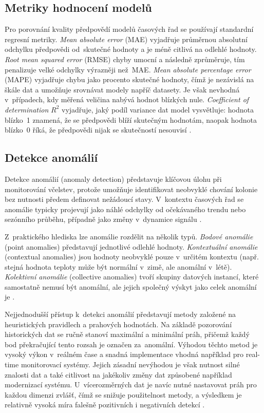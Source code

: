 \subsection*{Metriky hodnocení modelů}
Pro porovnání kvality předpovědí modelů časových řad se používají standardní regresní metriky. \textit{Mean absolute error} (MAE) vyjadřuje průměrnou absolutní odchylku předpovědi od~skutečné hodnoty a je méně citlivá na odlehlé hodnoty. \textit{Root mean squared error} (RMSE) chyby umocní a následně zprůměruje, tím penalizuje velké odchylky výrazněji než~MAE. \textit{Mean absolute percentage error} (MAPE) vyjadřuje chybu jako procento skutečné hodnoty, čímž je nezávislá na škále dat a umožňuje srovnávat modely napříč datasety. Je však nevhodná v~případech, kdy měřená veličina nabývá hodnot blízkých nule. \textit{Coefficient of determination} \(R^2\) vyjadřuje, jaký podíl variance dat model vysvětluje: hodnota blízko~1 znamená, že se předpovědi blíží skutečným hodnotám, naopak hodnota blízko~0 říká, že předpovědi nijak se skutečností nesouvisí \cite{Hyndman2018}.

\subsection*{Detekce anomálií}
Detekce anomálií (anomaly detection) představuje klíčovou úlohu při monitorování včelstev, protože umožňuje identifikovat neobvyklé chování kolonie bez nutnosti předem definovat nežádoucí stavy. V~kontextu časových řad se anomálie typicky projevují jako náhlé odchylky od očekávaného trendu nebo sezónního průběhu, případně jako změny v~dynamice signálu \cite{Chandola2009}.

Z~praktického hlediska lze anomálie rozdělit na několik typů. \textit{Bodové anomálie} (point anomalies) představují jednotlivé odlehlé hodnoty. \textit{Kontextuální anomálie} (contextual anomalies) jsou hodnoty neobvyklé pouze v~určitém kontextu (např. stejná hodnota teploty může být normální v~zimě, ale anomální v~létě). \textit{Kolektivní anomálie} (collective anomalies) tvoří skupiny datových instancí, které samostatně nemusí být anomální, ale jejich společný výskyt jako celek anomální je \cite{Chandola2009}.

Nejjednodušší přístup k~detekci anomálií představují metody založené na heuristických pravidlech a prahových hodnotách. Na základě pozorování historických dat se ručně stanoví maximální a minimální práh, přičemž každý bod překračující tento rozsah je označen za~anomální. Výhodou těchto metod je vysoký výkon v~reálném čase a snadná implementace vhodná například pro real-time monitorovací systémy. Jejich zásadní nevýhodou je však nutnost silné znalosti dat a také citlivost na jakékoliv změny dat způsobené například modernizací systému. U~vícerozměrných dat je navíc nutné nastavovat práh pro každou dimenzi zvlášť, čímž se snižuje použitelnost metody, a výsledkem je relativně vysoká míra falešně pozitivních i negativních detekcí \cite{Chen2022}.

